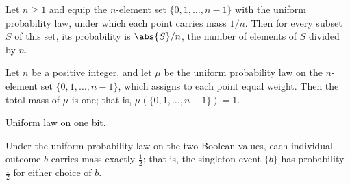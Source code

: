 \begin{theorem}
\label{CommunicationComplexity.Functions.Disjointness.RandomizedLowerBound.uniformFin_real}
\leanok
{}
Let $n \ge 1$ and equip the $n$-element set $\{0, 1, \dots, n-1\}$ with the uniform
probability law, under which each point carries mass $1/n$. Then for every subset $S$ of
this set, its probability is $\abs{S}/n$, the number of elements of $S$ divided by $n$.
\end{theorem}

\begin{theorem}
\label{CommunicationComplexity.Functions.Disjointness.RandomizedLowerBound.uniformFin_univ}
\leanok
{}
Let $n$ be a positive integer, and let $\mu$ be the uniform probability law on the
$n$-element set $\{0, 1, \dots, n-1\}$, which assigns to each point equal weight. Then
the total mass of $\mu$ is one; that is, $\mu(\{0,1,\dots,n-1\}) = 1$.
\end{theorem}

\begin{definition}[Uniformbool]
\label{CommunicationComplexity.Functions.Disjointness.RandomizedLowerBound.uniformBool}
\leanok
Uniform law on one bit.
\end{definition}

\begin{theorem}
\label{CommunicationComplexity.Functions.Disjointness.RandomizedLowerBound.uniformBool_singleton}
\leanok
{}
Under the uniform probability law on the two Boolean values, each individual outcome $b$
carries mass exactly $\tfrac{1}{2}$; that is, the singleton event $\{b\}$ has
probability $\tfrac{1}{2}$ for either choice of $b$.
\end{theorem}

